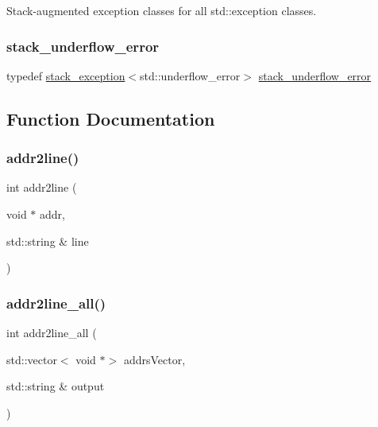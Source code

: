 Stack-\/augmented exception classes for all std\+::exception classes. 

\mbox{\label{namespacestacktrace_aaef0a4d9cce48504f61bacbb2d6293a0}} 
\subsubsection{\texorpdfstring{stack\+\_\+underflow\+\_\+error}{stack\_underflow\_error}}
{\footnotesize\ttfamily typedef \mbox{\hyperlink{classstacktrace_1_1stack__exception}{stack\+\_\+exception}}$<$std\+::underflow\+\_\+error$>$ \mbox{\hyperlink{namespacestacktrace_aaef0a4d9cce48504f61bacbb2d6293a0}{stack\+\_\+underflow\+\_\+error}}}



\subsection{Function Documentation}
\mbox{\label{namespacestacktrace_a8ebfe19f3a27f6414cfce5805074fe42}} 
\subsubsection{\texorpdfstring{addr2line()}{addr2line()}}
{\footnotesize\ttfamily int addr2line (\begin{DoxyParamCaption}\item[{void $\ast$}]{addr,  }\item[{std\+::string \&}]{line }\end{DoxyParamCaption})}

\mbox{\label{namespacestacktrace_a7cf09f4c670f51bba6cb67997b6026ad}} 
\subsubsection{\texorpdfstring{addr2line\+\_\+all()}{addr2line\_all()}\hspace{0.1cm}{\footnotesize\ttfamily [1/2]}}
{\footnotesize\ttfamily int addr2line\+\_\+all (\begin{DoxyParamCaption}\item[{std\+::vector$<$ void $\ast$$>$}]{addrs\+Vector,  }\item[{std\+::string \&}]{output }\end{DoxyParamCaption})}

